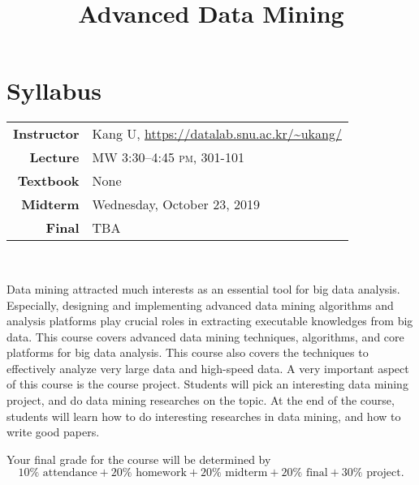 \documentclass{lnotes}
\title{Advanced Data Mining}
\begin{document}
\section*{Syllabus}

\begin{center}
\begin{tabular}{@{}rp{10cm}@{}}
\toprule 
\textbf{Instructor} & Kang U, \url{https://datalab.snu.ac.kr/~ukang/} \\
\textbf{Lecture} & MW 3:30--4:45 \textsc{pm}, 301-101 \\
\textbf{Textbook} & None \\
\textbf{Midterm} & Wednesday, October 23, 2019 \\
\textbf{Final} & TBA \\
\bottomrule 
\end{tabular} \\[3ex]
\end{center}

Data mining attracted much interests as an essential tool for big data analysis. Especially, designing and implementing advanced data mining algorithms and analysis platforms play crucial roles in extracting executable knowledges from big data. This course covers advanced data mining techniques, algorithms, and core platforms for big data analysis. This course also covers the techniques to effectively analyze very large data and high-speed data.
A very important aspect of this course is the course project. Students will pick an interesting data mining project, and do data mining researches on the topic. At the end of the course, students will learn how to do interesting researches in data mining, and how to write good papers.

Your final grade for the course will be determined by
$$
10\% \text{ attendance} + 20\% \text{ homework} + 20\% \text{ midterm} + 20\% \text{ final} + 30\% \text{ project}.
$$

 


\end{document}
